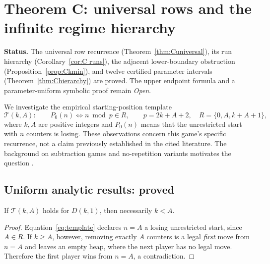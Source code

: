 \section{Theorem C: universal rows and the infinite regime hierarchy}\label{sec:C}
\textbf{Status.} The universal row recurrence (Theorem~\ref{thm:Cuniversal}), its run hierarchy (Corollary~\ref{cor:C runs}), the adjacent lower-boundary obstruction (Proposition~\ref{prop:Ckmin}), and twelve certified parameter intervals (Theorem~\ref{thm:Chierarchy}) are proved. The upper endpoint formula and a parameter-uniform symbolic proof remain \emph{Open}.

We investigate the empirical starting-position template
\begin{equation}\label{eq:template}
\mathcal{T}(k,A):\qquad P_0(n)\iff n\bmod p\in R,\qquad
p=2k+A+2,\quad R=\{0,A,k+A+1\},
\end{equation}
where $k,A$ are positive integers and $P_0(n)$ means that the unrestricted start with $n$ counters is losing. These observations concern this game's specific recurrence, not a claim previously established in the cited literature. The background on subtraction games and no-repetition variants motivates the question \cite{winningways2001,gurvich2012}.

\subsection{Uniform analytic results: proved}
\begin{proposition}\label{prop:Cupper}
If $\mathcal{T}(k,A)$ holds for $D(k,1)$, then necessarily $k<A$.
\end{proposition}
\begin{proof}
Equation~\eqref{eq:template} declares $n=A$ a losing unrestricted start, since $A\in R$. If $k\ge A$, however, removing exactly $A$ counters is a legal \emph{first} move from $n=A$ and leaves an empty heap, where the next player has no legal move. Therefore the first player wins from $n=A$, a contradiction.
\end{proof}

